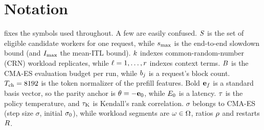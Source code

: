 %

\section{Notation}
\label{app:notation}\label{sec:notation}

 fixes the symbols used throughout. A few are easily confused. $S$ is the
set of eligible candidate workers for one request, while $s_{\max}$ is the end-to-end slowdown bound
(and $I_{\max}$ the mean-ITL bound). $k$ indexes common-random-number (CRN) workload replicates,
while $\ell = 1,\dots,r$ indexes context terms. $B$ is the CMA-ES evaluation budget per
run, while $b_j$ is a request's block count. $T_{\mathrm{ch}} = 8192$ is the token normalizer of the
prefill features. Bold $\mathbf{e}_{f}$ is a standard basis vector, so the parity anchor is
$\theta = -\mathbf{e}_{0}$, while $E_0$ is a latency. $\tau$ is the policy temperature, and
$\tau_{\mathrm{K}}$ is Kendall's rank correlation. $\sigma$ belongs to CMA-ES (step size $\sigma$, initial
$\sigma_{0}$), while workload segments are $\omega \in \Omega$, ratios $\rho$ and restarts
$R$.


